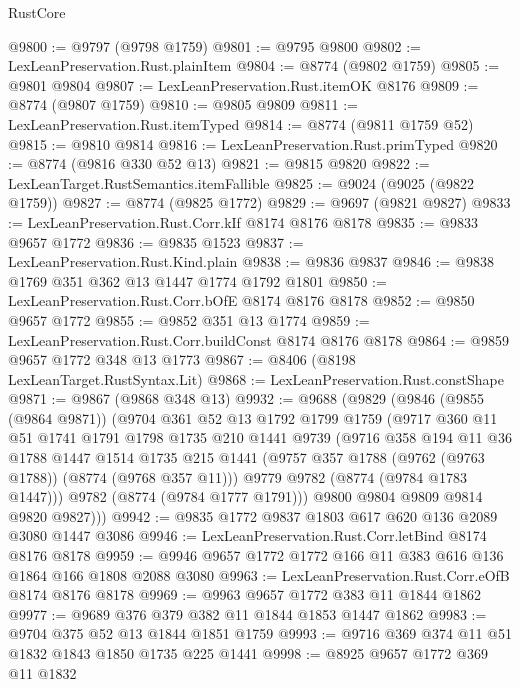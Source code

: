 \begin{lexlean}{RustCore}
\begin{coremodule}
@9800 := @9797 (@9798 @1759)
@9801 := @9795 @9800
@9802 := LexLeanPreservation.Rust.plainItem
@9804 := @8774 (@9802 @1759)
@9805 := @9801 @9804
@9807 := LexLeanPreservation.Rust.itemOK @8176
@9809 := @8774 (@9807 @1759)
@9810 := @9805 @9809
@9811 := LexLeanPreservation.Rust.itemTyped
@9814 := @8774 (@9811 @1759 @52)
@9815 := @9810 @9814
@9816 := LexLeanPreservation.Rust.primTyped
@9820 := @8774 (@9816 @330 @52 @13)
@9821 := @9815 @9820
@9822 := LexLeanTarget.RustSemantics.itemFallible
@9825 := @9024 (@9025 (@9822 @1759))
@9827 := @8774 (@9825 @1772)
@9829 := @9697 (@9821 @9827)
@9833 := LexLeanPreservation.Rust.Corr.kIf @8174 @8176 @8178
@9835 := @9833 @9657 @1772
@9836 := @9835 @1523
@9837 := LexLeanPreservation.Rust.Kind.plain
@9838 := @9836 @9837
@9846 := @9838 @1769 @351 @362 @13 @1447 @1774 @1792 @1801
@9850 := LexLeanPreservation.Rust.Corr.bOfE @8174 @8176 @8178
@9852 := @9850 @9657 @1772
@9855 := @9852 @351 @13 @1774
@9859 := LexLeanPreservation.Rust.Corr.buildConst @8174 @8176 @8178
@9864 := @9859 @9657 @1772 @348 @13 @1773
@9867 := @8406 (@8198 LexLeanTarget.RustSyntax.Lit)
@9868 := LexLeanPreservation.Rust.constShape
@9871 := @9867 (@9868 @348 @13)
@9932 := @9688
    (@9829
      (@9846
        (@9855 (@9864 @9871))
        (@9704
          @361
          @52
          @13
          @1792
          @1799
          @1759
          (@9717
            @360
            @11
            @51
            @1741
            @1791
            @1798
            @1735
            @210
            @1441
            @9739
            (@9716
              @358
              @194
              @11
              @36
              @1788
              @1447
              @1514
              @1735
              @215
              @1441
              (@9757 @357 @1788 (@9762 (@9763 @1788)) (@8774 (@9768 @357 @11)))
              @9779
              @9782
              (@8774 (@9784 @1783 @1447)))
            @9782
            (@8774 (@9784 @1777 @1791)))
          @9800
          @9804
          @9809
          @9814
          @9820
          @9827)))
@9942 := @9835 @1772 @9837 @1803 @617 @620 @136 @2089 @3080 @1447 @3086
@9946 := LexLeanPreservation.Rust.Corr.letBind @8174 @8176 @8178
@9959 := @9946 @9657 @1772 @1772 @166 @11 @383 @616 @136 @1864 @166 @1808 @2088 @3080
@9963 := LexLeanPreservation.Rust.Corr.eOfB @8174 @8176 @8178
@9969 := @9963 @9657 @1772 @383 @11 @1844 @1862
@9977 := @9689 @376 @379 @382 @11 @1844 @1853 @1447 @1862
@9983 := @9704 @375 @52 @13 @1844 @1851 @1759
@9993 := @9716 @369 @374 @11 @51 @1832 @1843 @1850 @1735 @225 @1441
@9998 := @8925 @9657 @1772 @369 @11 @1832

\end{coremodule}
\end{lexlean}
